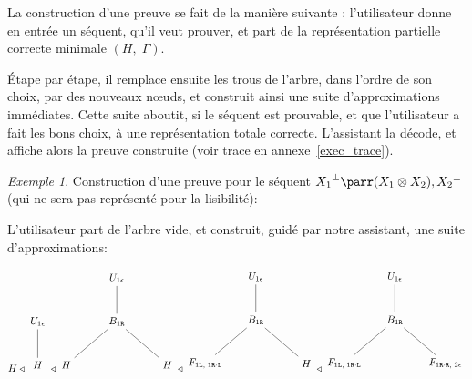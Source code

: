 \documentclass[11pt,a4paper]{article}
\theoremstyle{plain}
\theoremstyle{definition}
\theoremstyle{remark}
\newtheorem{example}{Exemple}
\newcommand*{\orth}{^\perp}
\newcommand*{\tensor}{\otimes}
\newcommand*{\sequent}{\Gamma}
\newcommand*{\Left}{\textnormal{\texttt{L}}}
\newcommand*{\Right}{\textnormal{\texttt{R}}}
\newcommand*{\relapprox}{\ensuremath{\triangleleft}}
\newcommand*{\unknown}{H}
\begin{document}
La construction d'une preuve se fait de la manière suivante : l'utilisateur donne en entrée un séquent, qu'il veut prouver, et part de la représentation partielle correcte minimale $(\unknown, \; \sequent)$. 

Étape par étape, il remplace ensuite les trous de l'arbre, dans l'ordre de son choix, par des nouveaux n\oe{}uds, et construit ainsi une suite d'approximations immédiates. Cette suite aboutit, si le séquent est prouvable, et que l'utilisateur a fait les bons choix, à une représentation totale correcte. L'assistant la décode, et affiche alors la preuve construite (voir trace en annexe~\ref{exec_trace}).

\begin{example}
    Construction d'une preuve pour le séquent ${X_1}\orth \parr (X_1 \tensor X_2), {X_2}\orth$ (qui ne sera pas représenté pour la lisibilité):

    L'utilisateur part de l'arbre vide, et construit, guidé par notre assistant, une suite d'approximations:

    \begin{align*}
    \begin{multlined}
        \unknown 
        \relapprox
        \begin{tikzpicture}%
            [level 2/.style={sibling distance=3.5cm}]
            \node {$U_{1 \epsilon}$}
            child {node {$\unknown$}
            };
        \end{tikzpicture}
        \relapprox
        \begin{tikzpicture}%
            [level 2/.style={sibling distance=3.5cm}]
            \node {$U_{1 \epsilon}$}
            child {node {$B_{1 \Right}$}
                child {node {$\unknown$}}
                child {node {$\unknown$}}
            };
        \end{tikzpicture}
        \relapprox
        \begin{tikzpicture}%
            [level 2/.style={sibling distance=3.5cm}]
            \node {$U_{1 \epsilon}$}
            child {node {$B_{1 \Right}$}
                child {node {$F_{1 \Left, \; 1 \Right \cdot \Left}$}}
                child {node {$\unknown$}}
            };
        \end{tikzpicture}
        \relapprox
        \begin{tikzpicture}%
            [level 2/.style={sibling distance=3.5cm}]
            \node {$U_{1 \epsilon}$}
            child {node {$B_{1 \Right}$}
                child {node {$F_{1 \Left, \; 1 \Right \cdot \Left}$}}
                child {node {$F_{1 \Right \cdot \Right, \; 2 \epsilon}$}}
            };
        \end{tikzpicture}
    \end{multlined}
    \end{align*}


\end{example}
\end{document}
